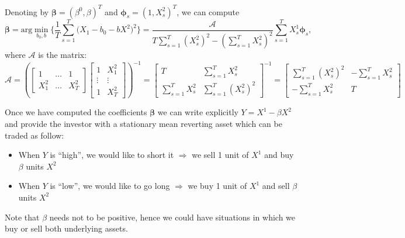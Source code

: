 \documentclass[a4paper,11pt]{article}
\theoremstyle{remark}
\theoremstyle{plain}
\begin{document}
Denoting by $\boldsymbol{\beta}=(\beta^0,\beta)^T$ and $\boldsymbol{\phi}_s=(1, X^2_s)^T$, we can compute
\begin{equation}
\label{eq:simpleOLS}
\boldsymbol{\beta}=\text{arg}\min\limits_{b_0,b}\Big\{\frac{1}{T}\sum\limits_{s=1}^{T}\big(X_1-b_0-b X^2\big)^2 \Big\}=\frac{\mathcal{A}}{T\sum\limits_{s=1}^{T}(X^2_s)^2-\left(\sum\limits_{s=1}^{T}X^2_s\right)^2}\sum\limits_{s=1}^{T}X^1_s \boldsymbol{\phi}_s,
\end{equation}
where $\mathcal{A}$ is the matrix:
\[
\mathcal{A}=\left(\begin{bmatrix}
    1 & \dots & 1\\
    X^2_1 & \dots & X^2_T 
\end{bmatrix}
\begin{bmatrix}
    1 & X^2_1 \\
    \vdots & \vdots \\
     1 & X^2_T
\end{bmatrix}
\right)^{-1}=\begin{bmatrix}
     T & \sum_{s=1}^{T}X^2_s \\
    \sum_{s=1}^{T}X^2_s & \sum_{s=1}^{T}(X^2_s)^2
\end{bmatrix}^{-1}=\begin{bmatrix}
    \sum_{s=1}^{T}(X^2_s)^2 & - \sum_{s=1}^{T}X^2_s \\
    - \sum_{s=1}^{T}X^2_s & T
\end{bmatrix}
\]

Once we have computed the coefficients $\boldsymbol{\beta}$ we can write explicitly $Y=X^1-\beta X^2$ and provide the investor with a stationary mean reverting asset which can be traded as follow:
\begin{itemize}
\item When $Y$ is ``high'', we would like to short it $\Rightarrow$ we sell 1 unit of $X^1$ and buy $\beta$ units $X^2$
\item When $Y$ is ``low'', we would like to go long $\Rightarrow$ we buy 1 unit of $X^1$ and sell $\beta$ units $X^2$
\end{itemize}
Note that $\beta$ needs not to be positive, hence we could have situations in which we buy or sell both underlying assets.
\end{document}
